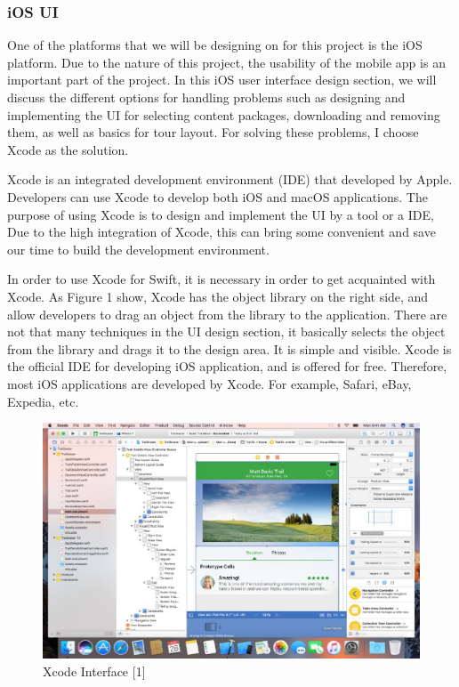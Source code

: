 \documentclass[letterpaper, 10pt,titlepage]{article}
\begin{document}
\subsubsection{iOS UI}
One of the platforms that we will be designing on for this project is the iOS platform. Due to the nature of this project, the usability of the mobile app is an important part of the project. In this iOS user interface design section, we will discuss the different options for handling problems such as designing and implementing the UI for selecting content packages, downloading and removing them, as well as basics for tour layout. For solving these problems, I choose Xcode as the solution.

Xcode is an integrated development environment (IDE) that developed by Apple. Developers can use Xcode to develop both iOS and macOS applications. The purpose of using Xcode is to design and implement the UI by a tool or a IDE, Due to the high integration of Xcode, this can bring some convenient and save our time to build the development environment.

In order to use Xcode for Swift, it is necessary in order to get acquainted with Xcode. As Figure 1 show, Xcode has the object library on the right side, and allow developers to drag an object from the library to the application. There are not that many techniques in the UI design section, it basically selects the object from the library and drags it to the design area. It is simple and visible. Xcode is the official IDE for developing iOS application, and is offered for free. Therefore, most iOS applications are developed by Xcode. For example, Safari, eBay, Expedia, etc.

\begin{figure}[ht]
    \centering
    \includegraphics[scale=0.5]{j1}
    \caption{Xcode Interface [1]}
    \label{jiawei1}
\end{figure}
\end{document}

